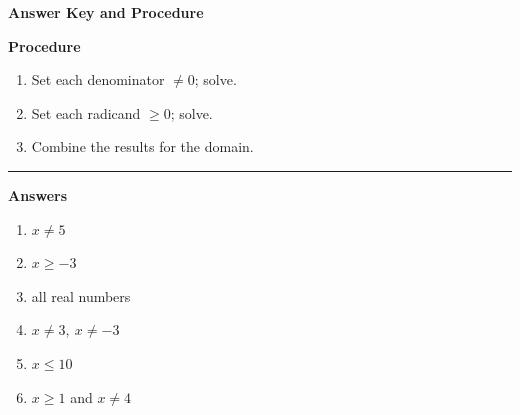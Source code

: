 \documentclass[12pt]{article}
\begin{document}
\begin{center}{\Large \textbf{Answer Key and Procedure}}\end{center}
\vspace{0.3cm}
\textbf{Procedure}
\begin{enumerate}
  \item Set each denominator $\neq 0$; solve.
  \item Set each radicand $\ge 0$; solve.
  \item Combine the results for the domain.
\end{enumerate}
\vspace{0.4cm}\hrule\vspace{0.4cm}
\textbf{Answers}
\begin{enumerate}[label=\textbf{\arabic*.}]
  \item $x\neq 5$
  \item $x\ge -3$
  \item all real numbers
  \item $x\neq 3,\ x\neq -3$
  \item $x\le 10$
  \item $x\ge 1$ and $x\neq 4$
\end{enumerate}
\end{document}
